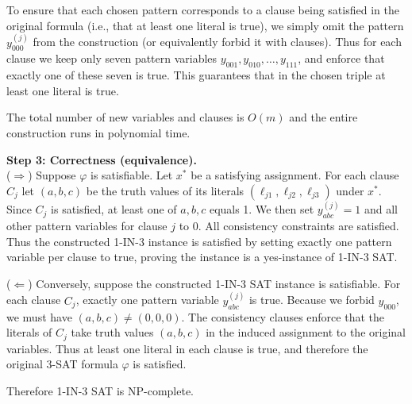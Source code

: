 To ensure that each chosen pattern corresponds to a clause being
satisfied in the original formula (i.e., that at least one literal is
true), we simply omit the pattern $y_{000}^{(j)}$ from the construction
(or equivalently forbid it with clauses).
Thus for each clause we keep only seven pattern variables
$y_{001}, y_{010}, \dots, y_{111}$,
and enforce that exactly one of these seven is true.
This guarantees that in the chosen triple at least one literal is true.

The total number of new variables and clauses is $O(m)$ and the entire
construction runs in polynomial time.


\noindent\textbf{Step 3: Correctness (equivalence).} \\

\noindent ($\Rightarrow$)
Suppose $\varphi$ is satisfiable. Let $x^*$ be a satisfying assignment.
For each clause $C_j$ let $(a,b,c)$ be the truth values of its literals
$(\ell_{j1},\ell_{j2},\ell_{j3})$ under $x^*$.
Since $C_j$ is satisfied, at least one of $a,b,c$ equals 1.
We then set $y_{abc}^{(j)} = 1$ and all other pattern variables for
clause $j$ to 0.  
All consistency constraints are satisfied.
Thus the constructed 1-IN-3 instance is satisfied by setting exactly one 
pattern variable per clause to true, proving the instance is a 
yes-instance of 1-IN-3 SAT.


\noindent ($\Leftarrow$)
Conversely, suppose the constructed 1-IN-3 SAT instance is satisfiable.
For each clause $C_j$, exactly one pattern variable $y^{(j)}_{abc}$ is
true. Because we forbid $y_{000}$, we must have $(a,b,c)\neq(0,0,0)$.
The consistency clauses enforce that the literals of $C_j$ take truth
values $(a,b,c)$ in the induced assignment to the original variables.
Thus at least one literal in each clause is true, and therefore the
original 3-SAT formula $\varphi$ is satisfied.

Therefore 1-IN-3 SAT is NP-complete.

\newpage